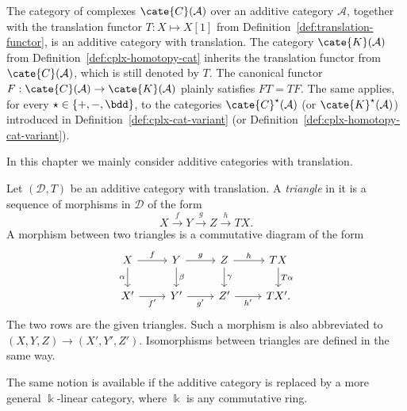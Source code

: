 \begin{example}\label{eg:cplx-as-translation-cat}
	The category of complexes $\cate{C}(\mathcal{A})$ over an additive
	category $\mathcal{A}$, together with the translation functor
	$T:X\mapsto X[1]$ from Definition~\ref{def:translation-functor}, is an
	additive category with translation. The category
	$\cate{K}(\mathcal{A})$ from Definition~\ref{def:cplx-homotopy-cat}
	inherits the translation functor from $\cate{C}(\mathcal{A})$, which is
	still denoted by $T$. The canonical functor
	$F:\cate{C}(\mathcal{A})\to\cate{K}(\mathcal{A})$ plainly satisfies
	$FT=TF$. The same applies, for every $\star\in\{+,-,\bdd\}$, to the
	categories $\cate{C}^{\star}(\mathcal{A})$ (or
	$\cate{K}^{\star}(\mathcal{A})$) introduced in
	Definition~\ref{def:cplx-cat-variant} (or
	Definition~\ref{def:cplx-homotopy-cat-variant}).
\end{example}

In this chapter we mainly consider additive categories with translation.

\begin{definition}
	Let $(\mathcal{D},T)$ be an additive category with translation. A
	\emph{triangle} in it is a sequence of morphisms in $\mathcal{D}$ of the
	form
	\[ X\xrightarrow{f}Y\xrightarrow{g}Z\xrightarrow{h}TX. \]
	A morphism between two triangles is a commutative diagram of the form
	\[\begin{tikzcd}
		X \arrow[r,"f"] \arrow[d,"\alpha"'] &
		Y \arrow[r,"g"] \arrow[d,"\beta"] &
		Z \arrow[r,"h"] \arrow[d,"\gamma"] &
		TX \arrow[d,"T\alpha"] \\
		X' \arrow[r,"{f'}"'] & Y' \arrow[r,"{g'}"'] &
		Z' \arrow[r,"{h'}"'] & TX'.
	\end{tikzcd}\]
	The two rows are the given triangles. Such a morphism is also abbreviated
	to $(X,Y,Z)\to(X',Y',Z')$. Isomorphisms between triangles are defined in
	the same way.

	The same notion is available if the additive category is replaced by a
	more general $\Bbbk$-linear category, where $\Bbbk$ is any commutative
	ring.
\end{definition}

